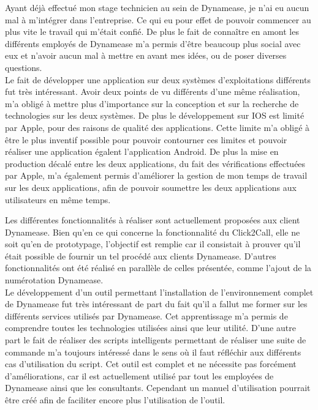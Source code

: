 Ayant déjà effectué mon stage technicien au sein de Dynamease, je n'ai eu aucun mal à m'intégrer dans l'entreprise. Ce qui eu pour effet de pouvoir commencer au plus vite le travail qui m'était confié. De plus le fait de connaître en amont les différents employés de Dynamease m'a permis d'être beaucoup plus social avec eux et n'avoir aucun mal à mettre en avant mes idées, ou de poser diverses questions.\\

Le fait de développer une application sur deux systèmes d'exploitations différents fut très intéressant. Avoir deux points de vu différents d'une même réalisation, m'a obligé à mettre plus d'importance sur la conception et sur la recherche de technologies sur les deux systèmes. De plus le développement sur IOS est limité par Apple, pour des raisons de qualité des applications. Cette limite m'a obligé à être le plus inventif possible pour pouvoir contourner ces limites et pouvoir réaliser une application égalent l'application Android. De plus la mise en production décalé entre les deux applications, du fait des vérifications effectuées par Apple, m'a également permis d'améliorer la gestion de mon temps de travail sur les deux applications, afin de pouvoir soumettre les deux applications aux utilisateurs en même temps.

Les différentes fonctionnalités à réaliser sont actuellement proposées aux client Dynamease. Bien qu'en ce qui concerne la fonctionnalité du Click2Call, elle ne soit qu'en de prototypage, l'objectif est remplie car il consistait à prouver qu'il était possible de fournir un tel procédé aux clients Dynamease. D'autres fonctionnalités ont été réalisé en parallèle de celles présentée, comme l'ajout de la numérotation Dynamease.\\

Le développement d'un outil permettant l'installation de l'environnement complet de Dynamease fut très intéressant de part du fait qu'il a fallut me former sur les différents services utilisés par Dynamease. Cet apprentissage m'a permis de comprendre toutes les technologies utilisées ainsi que leur utilité. D'une autre part le fait de réaliser des scripts intelligents permettant de réaliser une suite de commande m'a toujours intéressé dans le sens où il faut réfléchir aux différents cas d'utilisation du script. Cet outil est complet et ne nécessite pas forcément d'améliorations, car il est actuellement utilisé par tout les employées de Dynamease ainsi que les consultants. Cependant un manuel d'utilisation pourrait être créé afin de faciliter encore plus l'utilisation de l'outil.\\ 

